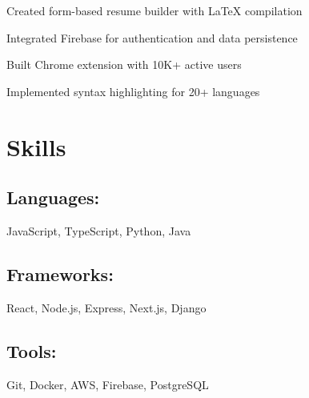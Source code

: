 \documentclass[]{deedy-resume-reversed}
\begin{document}
            \hfill
            \begin{tightemize}
            \item Created form-based resume builder with LaTeX compilation
\item Integrated Firebase for authentication and data persistence
            \end{tightemize}
            \sectionsep

            
            \hfill
            \begin{tightemize}
            \item Built Chrome extension with 10K+ active users
\item Implemented syntax highlighting for 20+ languages
            \end{tightemize}
            \sectionsep

            

\section{Skills}
\begin{minipage}[t]{0.78\textwidth}
\subsection{Languages:} JavaScript, TypeScript, Python, Java \\
\subsection{Frameworks:} React, Node.js, Express, Next.js, Django \\
\subsection{Tools:} Git, Docker, AWS, Firebase, PostgreSQL \\
\end{minipage}
\sectionsep
\end{document}
